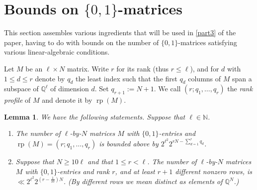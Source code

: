 \documentclass[11pt,reqno]{amsart}
\numberwithin{equation}{section}
\newtheorem{lemma}[theorem]{Lemma}
\theoremstyle{definition}
\theoremstyle{remark}
\newcommand\rp{\operatorname{rp}}
\renewcommand{\le}{\leqslant}
\renewcommand{\ge}{\geqslant}
\newcommand\Q{\mathbb{Q}}
\newcommand\N{\mathbb{N}}
\begin{document}
\section{Bounds on \texorpdfstring{$\{0,1\}$}{}-matrices}\label{01-matrix-subsection}

This section assembles various ingredients that will be used in \cref{part3} of the paper, having to do with bounds on the number of $\{0,1\}$-matrices satisfying various linear-algebraic conditions.


Let $M$ be an $\ell \times N$ matrix. Write $r$ for its rank (thus $r \le \ell$), and for $d$ with $1 \le d \le r$ denote by $q_d$ the least index such that the first $q_d$ columns of $M$ span a subspace of $\Q^{\ell}$ of dimension $d$. Set $q_{r+1} := N+1$. We call $(r; q_1,\dots, q_r)$ the \emph{rank profile} of $M$ and denote it by $\rp(M)$.

\begin{lemma} \label{lem24}We have the following statements. Suppose that $\ell \in \N$.
\begin{enumerate}
    \item[\textup{(i)}] The number of $\ell$-by-$N$ matrices $M$ with $\{0,1\}$-entries and $\rp(M) = (r; q_1,\dots, q_{r})$ is bounded above by $2^{\ell^2} 2^{rN - \sum_{d = 1}^r q_d}$.
    \item[\textup{(ii)}] Suppose that $N \ge 10 \ell$ and that $1 \le r < \ell$. The number of $\ell$-by-$N$ matrices $M$ with $\{0,1\}$-entries and rank $r$, and at least $r+1$ different nonzero rows, is $\ll 2^{\ell^2} 2^{(r-\frac{1}{10}) N}$. \textup{(}By different rows we mean distinct as elements of $\Q^N$.\textup{)}
\end{enumerate}

\end{lemma}
\end{document}

